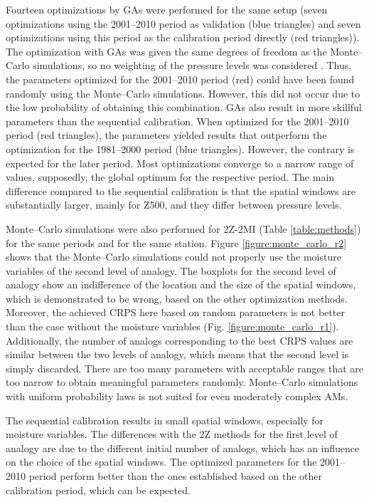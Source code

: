 \documentclass[gmd]{copernicus}
\begin{document}
Fourteen optimizations by GAs were performed for the same setup (seven optimizations using the 2001--2010 period as validation (blue triangles) and seven optimizations using this period as the calibration period directly (red triangles)). The optimization with GAs was given the same degrees of freedom as the Monte--Carlo simulations, so no weighting of the pressure levels was considered \citep[as in][]{Horton2018a}. Thus, the parameters optimized for the 2001--2010 period (red) could have been found randomly using the Monte--Carlo simulations. However, this did not occur due to the low probability of obtaining this combination. GAs also result in more skillful parameters than the sequential calibration. When optimized for the 2001--2010 period (red triangles), the parameters yielded results that outperform the optimization for the 1981--2000 period (blue triangles). However, the contrary is expected for the later period. Most optimizations converge to a narrow range of values, supposedly, the global optimum for the respective period. The main difference compared to the sequential calibration is that the spatial windows are substantially larger, mainly for Z500, and they differ between pressure levels.  

Monte--Carlo simulations were also performed for 2Z-2MI (Table \ref{table:methods}) for the same periods and for the same station. Figure \ref{figure:monte_carlo_r2} shows that the Monte--Carlo simulations could not properly use the moisture variables of the second level of analogy. The boxplots for the second level of analogy show an indifference of the location and the size of the spatial windows, which is demonstrated to be wrong, based on the other optimization methods. Moreover, the achieved CRPS here based on random parameters is not better than the case without the moisture variables (Fig. \ref{figure:monte_carlo_r1}). Additionally, the number of analogs corresponding to the best CRPS values are similar between the two levels of analogy, which means that the second level is simply discarded. There are too many parameters with acceptable ranges that are too narrow to obtain meaningful parameters randomly. Monte--Carlo simulations with uniform probability laws is not suited for even moderately complex AMs. 

The sequential calibration results in small spatial windows, especially for moisture variables. The differences with the 2Z methods for the first level of analogy are due to the different initial number of analogs, which has an influence on the choice of the spatial windows. The optimized parameters for the 2001--2010 period perform better than the ones established based on the other calibration period, which can be expected.
\end{document}
